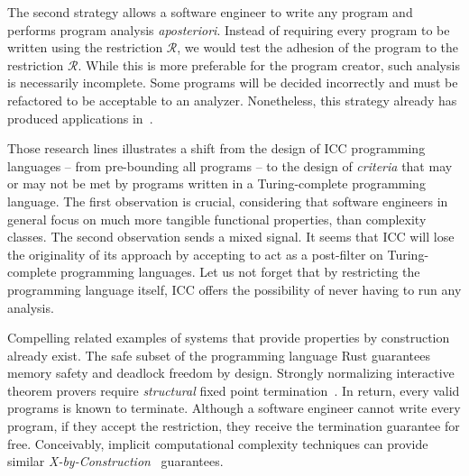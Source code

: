 The second strategy allows a software engineer to write any program and performs program analysis \emph{aposteriori}.
Instead of requiring every program to be written using the restriction \(\mathcal{R}\),
we would test the adhesion of the program to the restriction \(\mathcal{R}\).
While this is more preferable for the program creator, such analysis is necessarily incomplete.
Some programs will be decided incorrectly and must be refactored to be acceptable to an analyzer.
Nonetheless, this strategy already has produced applications in~\textcite{moyen2016,moyen20172}.

Those research lines illustrates a shift from the design of ICC programming languages -- from pre-bounding all programs --
to the design of \emph{criteria} that may or may not be met by programs written in a Turing-complete programming language.
The first observation is crucial, considering that software engineers in general focus on much more tangible functional properties,
than complexity classes.
The second observation sends a mixed signal.
It seems that ICC will lose the originality of its approach by accepting to act as a post-filter on Turing-complete programming languages.
Let us not forget that by restricting the programming language itself, ICC offers the possibility of never having to run any analysis.

Compelling related examples of systems that provide properties by construction already exist.
The safe subset of the programming language Rust guarantees \eg memory safety and deadlock freedom by design.
Strongly normalizing interactive theorem provers require \emph{structural} fixed point termination~\cite{bertot2004}.
In return, every valid programs is known to terminate.
Although a software engineer cannot write every program, if they accept the restriction, they receive the termination guarantee for free.
Conceivably, implicit computational complexity techniques can provide similar \emph{X-by-Construction}~\cite{terbeek2018} guarantees.
